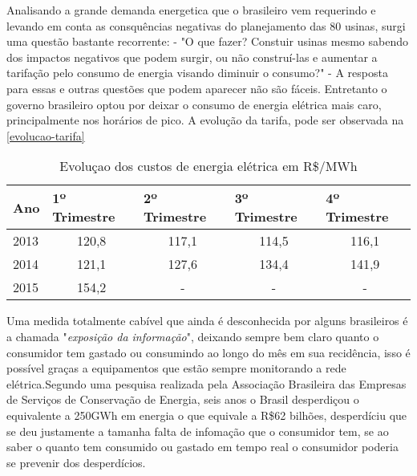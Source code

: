 Analisando a grande demanda energetica que o brasileiro vem requerindo e levando em conta as consquências negativas do planejamento das 80 usinas,
surgi uma questão bastante recorrente: - "O que fazer? Constuir usinas mesmo sabendo dos impactos negativos que podem surgir, ou não construí-las e
aumentar a tarifação pelo consumo de energia visando diminuir o consumo?" - A resposta para essas e outras questões que podem aparecer não são fáceis.
Entretanto o governo brasileiro optou por deixar o consumo de energia elétrica mais caro, principalmente nos horários de pico. A evolução da tarifa,
pode ser observada na \autoref{evolucao-tarifa}


\begin{table}[!ht]
	\centering
	\begin{tabular}{lcccc}
	\hline
	\textbf{Ano} & \multicolumn{1}{l}{\textbf{1º Trimestre}} & \multicolumn{1}{l}{\textbf{2º Trimestre}} & \multicolumn{1}{l}{\textbf{3º Trimestre}} & \multicolumn{1}{l}{\textbf{4º Trimestre}} \\ \hline
	\rowcolor[HTML]{DDDDDD} 
	2013         & 120,8                                     & 117,1                                     & 114,5                                     & 116,1                                     \\
	2014         & 121,1                                     & 127,6                                     & 134,4                                     & 141,9                                     \\
	\rowcolor[HTML]{DDDDDD} 
	2015         & 154,2                                     & -                                         & -                                         & -                                        
	\end{tabular}
	\caption{Evoluçao dos custos de energia elétrica em R\$/MWh}
	\label{evolucao-tarifa}
\end{table}

Uma medida totalmente cabível que ainda é desconhecida por alguns brasileiros é a chamada "\textit{exposição da informação}", deixando sempre bem claro 
quanto o consumidor tem gastado ou consumindo ao longo do mês em sua recidência, isso é possível graças a equipamentos que estão sempre monitorando
a rede elétrica.Segundo uma pesquisa realizada pela Associação Brasileira das Empresas de Serviços de Conservação de Energia, seis anos o Brasil 
desperdiçou o equivalente a 250GWh em energia o que equivale a R\$62 bilhões, desperdíciu que se deu justamente a tamanha falta de infomação que 
o consumidor tem, se ao saber o quanto tem consumido ou gastado em tempo real o consumidor poderia se prevenir dos desperdícios. 

